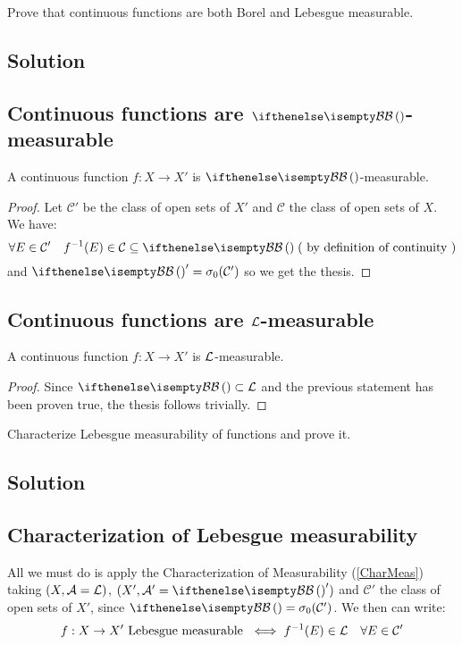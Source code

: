 
\question

Prove that continuous functions are both Borel and Lebesgue measurable.

\subsection*{Solution}

\subsection{Continuous functions are \texorpdfstring{$\B$}{Borel}-measurable}
A continuous function $f:X\to X'$ is $\B$-measurable.

\begin{proof}
    Let $\mathcal{C}'$ be the class of open sets of $X'$ and $\mathcal{C}$ the class of open sets of $X$. We have:
    \[
        \forall E \in \mathcal{C}' \quad f^{-1}(E)\in\mathcal{C} \subseteq \B \; (\text{ by definition of continuity })
    \]
    and $\B'=\sigma_0(\mathcal{C}')$ so we get the thesis.
\end{proof}

\subsection{Continuous functions are \texorpdfstring{$\mathcal{L}$}{Lebesgue}-measurable}
A continuous function $f:X\to X'$ is $\mathcal{L}$-measurable.

\begin{proof}
    Since $\B \subset \Leb$ and the previous statement has been proven true, the thesis follows trivially.
\end{proof}


\question

Characterize Lebesgue measurability of functions and prove it.

\subsection*{Solution}

\subsection{Characterization of Lebesgue measurability}
All we must do is apply the Characterization of Measurability (\ref{CharMeas}) taking $(X,\mathcal{A}=\mathcal{L})$, $(X', \A'=\B')$ and $\mathcal{C}'$ the class of open sets of $X'$, since $\B=\sigma_0(\mathcal{C}')$. We then can write:
\[
    f:X\to X' \text{ Lebesgue measurable } \iff f^{-1}(E)\in\mathcal{L} \quad \forall E\in\mathcal{C}'
\]

